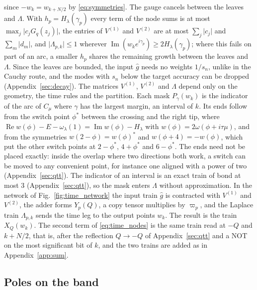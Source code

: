\documentclass[aps,prb,reprint,a4paper]{revtex4-2}
\DeclareMathOperator{\Imag}{Im}
\DeclareMathOperator{\Real}{Re}
\begin{document}
since $-w_k=w_{k+N/2}$ by \eqref{eq:symmetries}. The gauge cancels between the leaves and $\Lambda$. With $h_p=H_\lambda(\gamma_p)$ every term of the node sums is at most $\max_j\lvert c_jG_q(z_j)\rvert$, the entries of $V^{(1)}$ and $V^{(2)}$ are at most $\sum_j\lvert c_j\rvert$ and $\sum_m\lvert d_m\rvert$, and $\lvert\Lambda_{p,k}\rvert\le1$ wherever $\Imag(w_ke^{i\gamma_p})\ge2H_\lambda(\gamma_p)$; where this fails on part of an arc, a smaller $h_p$ shares the remaining growth between the leaves and $\Lambda$. Since the leaves are bounded, the input $\hat g$ needs no weights $1/s_n$, unlike in the Cauchy route, and the modes with $s_n$ below the target accuracy can be dropped (Appendix~\ref{sec:decay}). The matrices $V^{(1)}$, $V^{(2)}$ and $\Lambda$ depend only on the geometry, the time rules and the partition. Each mask $P_\gamma(w_k)$ is the indicator of the arc of $C_\mu$ where $\gamma$ has the largest margin, an interval of $k$. Its ends follow from the switch point $\phi^*$ between the crossing and the right tip, where $\Real w(\phi)-E-\omega_\lambda(1)=\Imag w(\phi)-H_\lambda$ with $w(\phi)=2\omega(\phi+i\tau\mu)$, and from the symmetries $w(2-\phi)=w(\phi)^*$ and $w(\phi+4)=-w(\phi)$, which put the other switch points at $2-\phi^*$, $4+\phi^*$ and $6-\phi^*$. The ends need not be placed exactly: inside the overlap where two directions both work, a switch can be moved to any convenient point, for instance one aligned with a power of two (Appendix~\ref{sec:qtt}). The indicator of an interval is an exact train of bond at most 3 (Appendix~\ref{sec:qtt}), so the mask enters $\Lambda$ without approximation. In the network of Fig.~\ref{fig:time_network} the input train $\hat g$ is contracted with $V^{(1)}$ and $V^{(2)}$, the adder forms $Y_p(Q)$, a copy tensor multiplies by $\varpi_p$, and the Laplace train $\Lambda_{p,k}$ sends the time leg to the output points $w_k$. The result is the train $X_Q(w_k)$. The second term of \eqref{eq:time_nodes} is the same train read at $-Q$ and $k+N/2$, that is, after the reflection $Q\to-Q$ of Appendix~\ref{sec:qtt} and a NOT on the most significant bit of $k$, and the two trains are added as in Appendix~\ref{app:sum}.

\subsection{Poles on the band}
\label{sec:poles}
\end{document}
